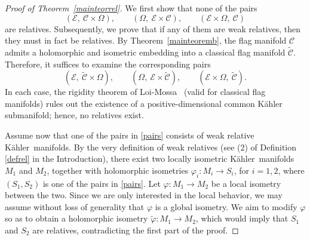 \documentclass[reqno]{amsart}
\newcommand{\K}{K\"{a}hler}
\begin{document}
\begin{proof}[Proof of Theorem~\ref{mainteorrel}]
We first show that none of the pairs 
\begin{equation}\label{pairs}
(\mathcal E,\ \mathcal C\times\Omega),\qquad
(\Omega,\ \mathcal E\times\mathcal C),\qquad
(\mathcal E\times\Omega,\  \mathcal C)
\end{equation}
are relatives. Subsequently, we prove that if any of them are weak relatives, then they must in fact be relatives.
By Theorem~\ref{mainteoremb}, the flag manifold $\mathcal C$ admits a holomorphic and isometric embedding into a classical flag manifold $\widetilde{\mathcal C}$. Therefore, it suffices to examine the corresponding pairs
\[
(\mathcal E,\ \widetilde{\mathcal C}\times\Omega),\qquad
(\Omega,\ \mathcal E\times \widetilde{\mathcal C}),\qquad
(\mathcal E\times\Omega,\  \widetilde{\mathcal C}).
\]
In each case, the rigidity theorem of Loi-Mossa~\cite[Thm~1.2]{LMrighom} (valid for classical flag manifolds) rules out the existence of a positive-dimensional common Kähler submanifold; hence, no relatives exist.

Assume now that one of the pairs in \eqref{pairs} consists of weak relative \K\ manifolds. By
the very definition of weak relatives (see (2) of Definition \ref{defrel} in the Introduction), there exist two locally isometric \K\ manifolds $M_1$ and $M_2$, together with holomorphic isometries $\varphi_i \colon M_i \to S_i$, for \(i = 1,2\), where \((S_1, S_2)\) is one of the pairs in \eqref{pairs}. Let $\varphi \colon M_1 \to M_2$ be a local isometry between the two. Since we are only interested in the local behavior, we may assume without loss of generality that $\varphi$ is a global isometry.
We aim to modify $\varphi$ so as to obtain a holomorphic isometry $\tilde{\varphi} \colon M_1 \to M_2$, which would imply that \(S_1\) and \(S_2\) are relatives, contradicting the first part of the proof.


\end{proof}
\end{document}
